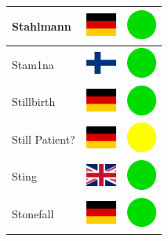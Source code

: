 \documentclass[12pt, a4paper, twoside]{report}
\begin{document}
\begin{center}
\begin{longtable}{|p{5cm}|p{2cm}|p{2cm}|}
 Stahlmann                                                  & \includegraphics[width=1cm]{../4x3/de} &   \includegraphics[width=1cm]{../likes/y} \\ \hline
 Stam1na                                                    & \includegraphics[width=1cm]{../4x3/fi} &   \includegraphics[width=1cm]{../likes/y} \\ \hline
 Stillbirth                                                 & \includegraphics[width=1cm]{../4x3/de} &   \includegraphics[width=1cm]{../likes/y} \\ \hline
 Still Patient?                                             & \includegraphics[width=1cm]{../4x3/de} &   \includegraphics[width=1cm]{../likes/m} \\ \hline
 Sting                                                      & \includegraphics[width=1cm]{../4x3/gb} &   \includegraphics[width=1cm]{../likes/y} \\ \hline
 Stonefall                                                  & \includegraphics[width=1cm]{../4x3/de} &   \includegraphics[width=1cm]{../likes/y} \\ \hline

\end{longtable}
\end{center}
\end{document}
